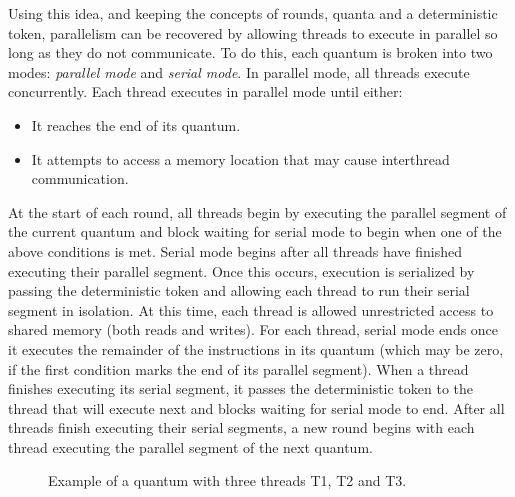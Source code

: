 Using this idea, and keeping the concepts of rounds, quanta and a
deterministic token, parallelism can be recovered by allowing threads
to execute in parallel so long as they do not communicate.  To do
this, each quantum is broken into two modes: \emph{parallel mode} and
\emph{serial mode}.  In parallel mode, all threads execute
concurrently.  Each thread executes in parallel mode until either:

\begin{itemize}
\item It reaches the end of its quantum.

\item It attempts to access a memory location that may cause
  interthread communication.
\end{itemize}

At the start of each round, all threads begin by executing the
parallel segment of the current quantum and block waiting for serial
mode to begin when one of the above conditions is met.  Serial mode
begins after all threads have finished executing their parallel
segment.  Once this occurs, execution is serialized by passing the
deterministic token and allowing each thread to run their serial
segment in isolation.  At this time, each thread is allowed
unrestricted access to shared memory (both reads and writes).  For
each thread, serial mode ends once it executes the remainder of the
instructions in its quantum (which may be zero, if the first condition
marks the end of its parallel segment).  When a thread finishes
executing its serial segment, it passes the deterministic token to the
thread that will execute next and blocks waiting for serial mode to
end.  After all threads finish executing their serial segments, a new
round begins with each thread executing the parallel segment of the
next quantum.

\begin{figure}[!]
  \begin{center}
    {}
  \end{center}
  \caption{Example of a quantum with three threads T1, T2 and T3.}
  \label{fig:quantum}
\end{figure}

